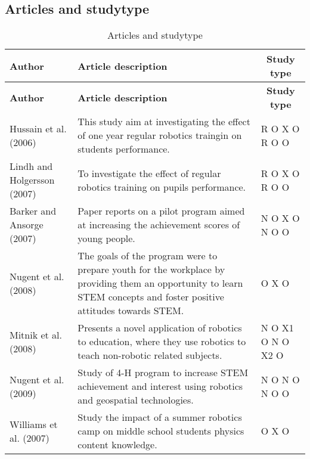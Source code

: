 \subsection*{Articles and studytype}
\setlength\LTleft{0px}
\setlength\LTright{0px}
\begin{longtable}{@{\extracolsep{\fill}}p{}p{}p{}}
	
	
	\hline \multicolumn{1}{l}{\textbf{Author}} & \multicolumn{1}{l}{\textbf{Article description}} & \multicolumn{1}{c}{\textbf{Study type	}} \\ \hline\hline
	\endfirsthead
	\hline\multicolumn{1}{l}{\textbf{Author}} & \multicolumn{1}{l}{\textbf{Article description}} & \multicolumn{1}{c}{\textbf{Study type	}} \\ \hline\hline
	\endhead
	\hline \caption{Articles and studytype}\endlastfoot
	Hussain et al. (2006)\cite{hussain2006effect} & This study aim at investigating the effect of one year regular robotics traingin on students performance. & R O X O R O O\\\hline
	Lindh and Holgersson (2007)\cite{lindh2007does} & To investigate the effect of regular robotics training on pupils performance. & R O X O R O O\\\hline
	Barker and Ansorge (2007)\cite{barker2007robotics}& Paper reports on a pilot program aimed at increasing the achievement scores of young people. & N O X O N O O\\\hline
	Nugent et al. (2008)\cite{nugent2009use} & The goals of the program were to prepare youth for the workplace by providing them an opportunity to learn STEM concepts and foster positive attitudes towards STEM. & O X O\\\hline
	Mitnik et al. (2008)\cite{mitnik2008autonomous} & Presents a novel application of robotics to education, where they use robotics to teach non-robotic related subjects. & N O X1 O N O X2 O\\\hline
	Nugent et al. (2009)\cite{nugent2008effect} & Study of 4-H program to increase STEM achievement and interest using robotics and geospatial technologies. & N O N O N O O\\\hline
	Williams et al. (2007)\cite{williams2007acquisition} & Study the impact of a summer robotics camp on middle school students physics content knowledge.  & O X O\\\hline
\end{longtable}
